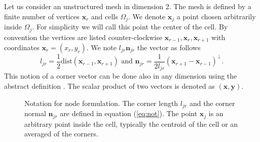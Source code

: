 \documentclass[a4paper,french,english,10pt]{article}
\newcommand\njr{\mathbf{n}_{jr}}
\newcommand\x{\mathbf{x}}
\newcommand\xj{\mathbf{x}_j}
\newcommand\xr{\mathbf{x}_r}
\begin{document}
Let us consider an unstructured mesh in dimension 2. The mesh is defined
by a finite number of vertices $\xr$ and cells $\Omega_{j}$. We
denote $\xj$ a point  chosen arbitrarily inside $\Omega_j$.
For simplicity we will call this point the center of the cell.
 By convention the vertices
are listed counter-clockwise $\x_{r-1},\xr,\x_{r+1}$
with
coordinates $\xr=(x_{r},y_{r})$. 
We note  $l_{jr}\njr$ the vector as follows
\begin{equation}\label{eq:not}
l_{jr}=\frac12 \mbox{dist}\left( \x_{r-1},\x_{r+1}\right) 
\mbox{ and }
\njr=\frac{1}{2l_{jr}}\left(
\x_{r+1}-\x_{r-1}
\right)^\perp.
\end{equation}
This notion of a corner vector can be done also in any dimension
using the abstract definition \cite{de10}.
The scalar product of two vectors is denoted as
$(\x,\mathbf{y})$.

\begin{figure}[ht!]
\begin{center}
\end{center}

\caption{Notation for node formulation. The corner length $l_{jr}$ 
and the corner normal $\njr$ are defined in equation (\ref{eq:not}).
The point $\x_j$ is an arbitrary point inside the cell, typically
the centroid of the cell or an averaged of the corners.
}
\end{figure}
\end{document}
